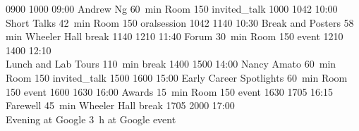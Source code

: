 \begin{timetable}
   {0900} {1000} {09:00 Andrew Ng}                            {60~min}                           {Room 150}                      {invited_talk}
   {1000} {1042} {10:00 Short Talks}                          {\vspace{1.5mm}42~min}             {\vspace{1.5mm}Room 150}        {oralsession}
   {1042} {1140} {10:30 Break and Posters}                    {\vspace{1.5mm}58 min}             {Wheeler Hall}      {break}
   {1140} {1210} {11:40 Forum}                                {\vspace{1.5mm}30~min}             {\vspace{1.5mm}Room 150}                      {event}
   {1210} {1400} {12:10\\[0.2em]Lunch and Lab Tours}          {110~min}                          {}                            {break}
   {1400} {1500} {14:00 Nancy Amato}                          {60~min}                           {Room 150}                      {invited_talk}
   {1500} {1600} {15:00 Early Career Spotlights} 	      {\vspace{1.5mm}60~min}             {\vspace{1.5mm}Room 150}        {event}
   {1600} {1630} {16:00 Awards} 	              {\vspace{1.5mm}15~min}             {\vspace{1.5mm}Room 150}        {event}
   {1630} {1705} {16:15 Farewell} 	              {\vspace{1.5mm}45~min}             {Wheeler Hall}        {break}
   {1705} {2000} {17:00\\\vspace{0.3em}Evening at Google}     {3~h}                              {at Google}     {event}
\end{timetable}






\begingroup %
\sffamily



